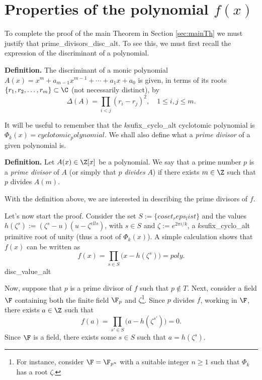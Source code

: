 \section{Properties of the polynomial \texorpdfstring{$f(x)$}{fx}}\label{sec:properties}
 
To complete the proof of the main Theorem in Section \ref{sec:mainTh} we must justify that {prime_divisors_disc_alt}. To see this, we must first recall the expression of the discriminant of a polynomial.

\textbf{Definition.} The discriminant of a monic polynomial $A(x)=x^m+a_{m-1}x^{m-1}+\cdots+a_1x+a_0$ is given, in terms of its roots $\{r_1,r_2,\dots,r_m\}\subset\C$ (not necessarily distinct), by
\begin{equation}\label{eq:discrim}
	\Delta(A)=\prod_{i<j}(r_i-r_j)^2, \quad 1\leqslant i,j\leqslant m.
\end{equation}

It will be useful to remember that the ${k}${sufix_cyclo_alt} cyclotomic polynomial is $\Phi_{{k}}(x)={cyclotomic_polynomial}$. We shall also define what a \emph{prime divisor} of a given polynomial is. 

\textbf{Definition.} Let $A(x)\in\Z[x]$ be a polynomial. We say that a prime number $p$ is a \emph{prime divisor} of $A$ (or simply that $p$ \emph{divides} $A$) if there exists $m\in\Z$ such that $p$ divides $A(m)$.

With the definition above, we are interested in describing the prime divisors of $f$.

Let's now start the proof. Consider the set $S:=\{{coset_reps_list}\}$ and the values $h(\zeta^{s}):=(\zeta^{s}-{u})({u}-\zeta^{{ell}s})$, with $s\in S$ and $\zeta:=e^{2\pi i/{{k}}}$, a ${k}${sufix_cyclo_alt} primitive root of unity (thus a root of $\Phi_{{k}}(x)$). A simple calculation shows that $f(x)$ can be written as
\begin{equation*}
f(x)=\prod_{s\in S}\big(x-h(\zeta^{s})\big)={poly}.
\end{equation*}
{disc_value_alt}

Now, suppose that $p$ is a prime divisor of $f$ such that $p\notin T$. Next, consider a field $\F$ containing both the finite field $\F_p$ and $\zeta$\footnote{For instance, consider $\F=\F_{p^n}$ with a suitable integer $n\geqslant 1$ such that $\Phi_{{k}}$ has a root $\zeta$.}. Since $p$ divides $f$, working in $\F$, there exists $a\in\Z$ such that 
\begin{equation*}
f(a)=\prod_{s'\in S}\big(a-h(\zeta^{s'})\big)=0.
\end{equation*}
Since $\F$ is a field, there exists some $s\in S$ such that $a=h(\zeta^{s})$.

